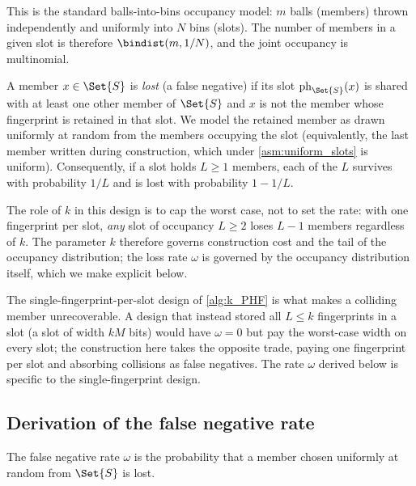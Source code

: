 \documentclass[ ../main.tex]{subfiles}
\begin{document}
This is the standard balls-into-bins occupancy model: $m$ balls (members) thrown independently and uniformly into $N$ bins (slots). The number of members in a given slot is therefore $\bindist(m, 1/N)$, and the joint occupancy is multinomial.

\begin{definition}
\label{def:loss}
A member $x \in \Set{S}$ is \emph{lost} (a false negative) if its slot $\ph_{\Set{S}}(x)$ is shared with at least one other member of $\Set{S}$ and $x$ is not the member whose fingerprint is retained in that slot. We model the retained member as drawn uniformly at random from the members occupying the slot (equivalently, the last member written during construction, which under \cref{asm:uniform_slots} is uniform). Consequently, if a slot holds $L \geq 1$ members, each of the $L$ survives with probability $1/L$ and is lost with probability $1 - 1/L$.
\end{definition}

The role of $k$ in this design is to cap the worst case, not to set the rate: with one fingerprint per slot, \emph{any} slot of occupancy $L \geq 2$ loses $L-1$ members regardless of $k$. The parameter $k$ therefore governs construction cost and the tail of the occupancy distribution; the loss rate $\omega$ is governed by the occupancy distribution itself, which we make explicit below.

\begin{remark}
\label{rem:single_fingerprint}
The single-fingerprint-per-slot design of \cref{alg:k_PHF} is what makes a colliding member unrecoverable. A design that instead stored all $L \leq k$ fingerprints in a slot (a slot of width $k M$ bits) would have $\omega = 0$ but pay the worst-case width on every slot; the construction here takes the opposite trade, paying one fingerprint per slot and absorbing collisions as false negatives. The rate $\omega$ derived below is specific to the single-fingerprint design.
\end{remark}

\subsection{Derivation of the false negative rate}
\label{sec:k_omega}
The false negative rate $\omega$ is the probability that a member chosen uniformly at random from $\Set{S}$ is lost.
\end{document}
